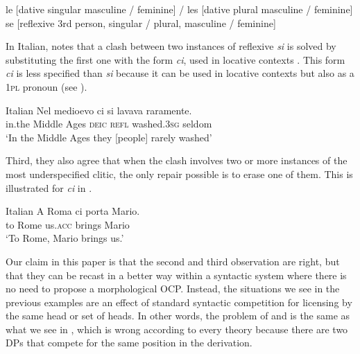 \documentclass[output=paper,modfonts,nonflat,newtxmath,colorlinks,citecolor=brown]{langsci/langscibook}
\begin{document}
\ea%
    \label{ex:cabre:3}
    \ea le [dative singular masculine / feminine]  / les [dative   plural masculine / feminine]  
    \ex se [reflexive 3rd person, singular / plural, masculine /   feminine]   
    \z
    \z

      
In Italian, \citet{Pescarini2007} notes that a clash between two instances of reflexive \textit{si} is solved by substituting the first one with the form \textit{ci}, used in locative contexts . This form \textit{ci} is less specified than \textit{si} because it can be used in locative contexts but also as a \textsc{1pl} pronoun (see \citealt{Ferrazzano2003}).

\ea%
    \label{ex:cabre:4}
    Italian 
    \ex
    \gll Nel medioevo  ci  si  lavava raramente. \\
    in.the {Middle Ages}  \textsc{deic} \textsc{refl}  washed.\textsc{3sg} seldom  \\
    \glt  ‘In the Middle Ages they [people] rarely washed’
    \z
    \z

          


 

Third, they also agree that when the clash involves two or more instances of the most underspecified clitic, the only repair possible is to erase one of them. This is illustrated for \textit{ci} in .

\ea%
    \label{ex:cabre:5}
    Italian 
    \ex
    \gll A Roma   ci  porta   Mario.  \\
    to Rome  us.\textsc{acc}  brings  Mario \\
    \glt  ‘To Rome, Mario brings us.’
    \z
    \z
    
Our claim in this paper is that the second and third observation are right, but that they can be recast in a better way within a syntactic system where there is no need to propose a morphological OCP. Instead, the situations we see in the previous examples are an effect of standard syntactic competition for licensing by the same head or set of heads. In other words, the problem of  and  is the same as what we see in , which is wrong according to every theory because there are two DPs that compete for the same position in the derivation.
\end{document}
